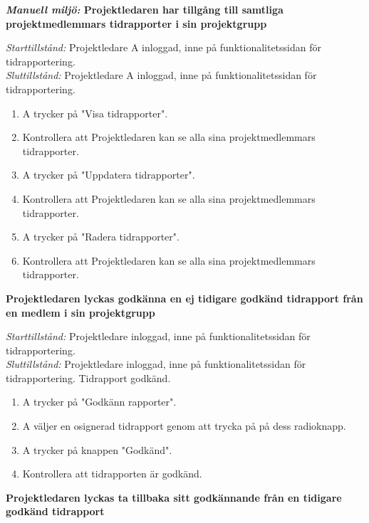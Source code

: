 \documentclass[a4paper]{article}
\begin{document}
\begin{FT}

\item
\textbf{\emph{Manuell miljö:} Projektledaren har tillgång till samtliga projektmedlemmars tidrapporter i sin projektgrupp}

\emph{Starttillstånd:} Projektledare A inloggad, inne på funktionalitetssidan för tidrapportering.\\
\emph{Sluttillstånd:} Projektledare A inloggad, inne på funktionalitetssidan för tidrapportering.

\begin{enumerate}
\item A trycker på "Visa tidrapporter".
\item Kontrollera att Projektledaren kan se alla sina projektmedlemmars tidrapporter.
\item A trycker på "Uppdatera tidrapporter".
\item Kontrollera att Projektledaren kan se alla sina projektmedlemmars tidrapporter.
\item A trycker på "Radera tidrapporter".
\item Kontrollera att Projektledaren kan se alla sina projektmedlemmars tidrapporter.
\end{enumerate}

\item
\textbf{Projektledaren lyckas godkänna en ej tidigare godkänd tidrapport från en medlem i sin projektgrupp}

\emph{Starttillstånd:} Projektledare inloggad, inne på funktionalitetssidan för tidrapportering.\\
\emph{Sluttillstånd:} Projektledare inloggad, inne på funktionalitetssidan för tidrapportering. Tidrapport godkänd.

\begin{enumerate}
\item A trycker på "Godkänn rapporter".
\item A väljer en osignerad tidrapport genom att trycka på på dess radioknapp.
\item A trycker på knappen "Godkänd".
\item Kontrollera att tidrapporten är godkänd.
\end{enumerate}

\item
\textbf{Projektledaren lyckas ta tillbaka sitt godkännande från en tidigare godkänd tidrapport}


\end{FT}
\end{document}
